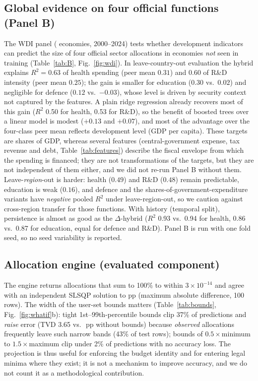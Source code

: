 \subsection{Global evidence on four official functions (Panel B)}\label{sec:wdi}
The WDI panel (\NWdiCountries{} economies, 2000--2024) tests whether development indicators can predict the size of four official sector allocations in economies \emph{not} seen in training (Table~\ref{tab:B}, Fig.~\ref{fig:wdi}). In leave-country-out evaluation the hybrid explains $R^2=0.63$ of health spending (peer mean $0.31$) and $0.60$ of R\&D intensity (peer mean $0.25$); the gain is smaller for education ($0.30$ vs.\ $0.02$) and negligible for defence ($0.12$ vs.\ $-0.03$), whose level is driven by security context not captured by the features. A plain ridge regression already recovers most of this gain ($R^2$ 0.50 for health, 0.53 for R\&D), so the benefit of boosted trees over a linear model is modest ($+0.13$ and $+0.07$), and most of the advantage over the four-class peer mean reflects development level (GDP per capita). These targets are shares of GDP, whereas several features (central-government expense, tax revenue and debt, Table~\ref{tab:features}) describe the fiscal envelope from which the spending is financed; they are not transformations of the targets, but they are not independent of them either, and we did not re-run Panel B without them. Leave-\emph{region}-out is harder: health ($0.49$) and R\&D ($0.48$) remain predictable, education is weak ($0.16$), and defence and the shares-of-government-expenditure variants have \emph{negative} pooled $R^2$ under leave-region-out, so we caution against cross-region transfer for those functions. With history (temporal split), persistence is almost as good as the $\Delta$-hybrid ($R^2$ 0.93 vs.\ 0.94 for health, 0.86 vs.\ 0.87 for education, equal for defence and R\&D). Panel B is run with one fold seed, so no seed variability is reported.


\figWdi

\subsection{Allocation engine (evaluated component)}\label{sec:engine}
The engine returns allocations that sum to 100\% to within $3\times10^{-14}$ and agree with an independent SLSQP solution to \NSlsqpDiff{} pp (maximum absolute difference, 100 rows). The width of the user-set bounds matters (Table~\ref{tab:bounds}, Fig.~\ref{fig:whatif}b): tight 1st--99th-percentile bounds clip 37\% of predictions and \emph{raise} error (TVD 3.65 vs.\ \EngTVDBefore\,pp without bounds) because \emph{observed} allocations frequently leave such narrow bands (43\% of test rows); bounds of $0.5\times$minimum to $1.5\times$maximum clip under 2\% of predictions with no accuracy loss. The projection is thus useful for enforcing the budget identity and for entering legal minima where they exist; it is not a mechanism to improve accuracy, and we do not count it as a methodological contribution.

